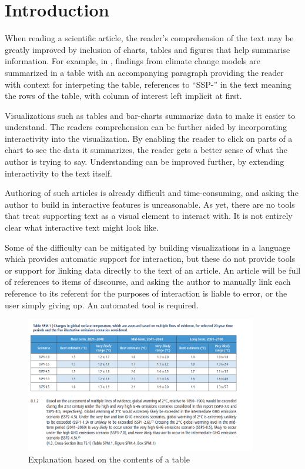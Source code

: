 \section{Introduction}

When reading a scientific article, the reader's comprehension of the text may
be greatly improved by inclusion of charts, tables and figures that help summarise information.
For example, in , findings from climate change models
are summarized in a table with an accompanying paragraph providing the reader
with context for interpeting the table, references to ``SSP-'' in the text meaning
the rows of the table, with column of interest left implicit at first.

Visualizations such as tables and bar-charts summarize data to make it easier to
understand. The readers comprehension can be further aided by incorporating 
interactivity into the visualization. By enabling the reader to click on parts
of a chart to see the data it summarizes, the reader gets a better sense of what
the author is trying to say. Understanding can be improved further, by extending
interactivity to the text itself.

Authoring of such articles is already difficult and time-consuming, and asking
the author to build in interactive features is unreasonable. As yet, there are
no tools that treat supporting text as a visual element to interact with. It is
not entirely clear what interactive text might look like. 

Some of the difficulty can be mitigated by building visualizations in a language
which provides automatic support for interaction, but these do not provide tools
or support for linking data directly to the text of an article. An article will
be full of references to items of discourse, and asking the author to manually
link each reference to its referent for the purposes of interaction is liable to
error, or the user simply giving up. An automated tool is required. 

\begin{figure}
   \includegraphics[width=0.9\textwidth]{fig/ipcc-table-explanation.png}
   \caption{Explanation based on the contents of a table}
   \label{fig:table-explanation}
\end{figure}